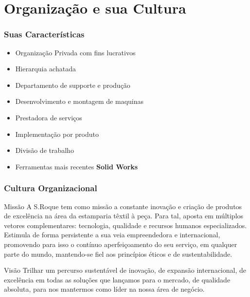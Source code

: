 \section{Organização e sua Cultura}
\begin{frame}
\frametitle{Suas Características}
\begin{itemize}
\item Organização Privada com fins lucrativos
\item Hierarquia achatada
\item Departamento de supporte e produção
\item Desenvolvimento e montagem de maquinas
\item Prestadora de serviços
\item Implementação por produto
\item Divisão de trabalho
\item Ferramentas mais recentes \textbf{Solid Works}
\end{itemize}
\end{frame}
\begin{frame}
\frametitle{Cultura Organizacional}
\begin{block}{Missão}
A S.Roque tem como missão a constante inovação e criação de produtos de excelência na área da estamparia têxtil à peça. Para tal, aposta em múltiplos vetores complementares: tecnologia, qualidade e recursos humanos especializados. Estimula de forma persistente a sua veia empreendedora e internacional, promovendo para isso o contínuo aperfeiçoamento do seu serviço, em qualquer parte do mundo, mantendo-se fiel aos princípios éticos e de sustentabilidade.
\end{block}
\begin{alertblock}{Visão}
Trilhar um percurso sustentável de inovação, de expansão internacional, de excelência em todas as soluções que lançamos para o mercado, de qualidade absoluta, para nos mantermos como líder na nossa área de negócio.
\end{alertblock}
\end{frame}
